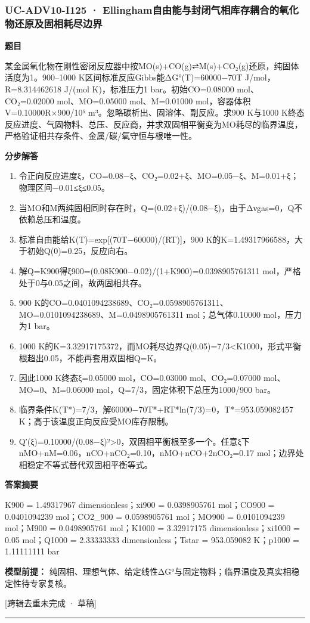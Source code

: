 \documentclass[UTF8,11pt,a4paper]{ctexart}
\begin{document}
\subsubsection*{UC-ADV10-I125 · Ellingham自由能与封闭气相库存耦合的氧化物还原及固相耗尽边界}
\noindent\textbf{题目}\par
某金属氧化物在刚性密闭反应器中按MO(s)+CO(g)⇌M(s)+CO₂(g)还原，纯固体活度为1。900–1000 K区间标准反应Gibbs能ΔG°(T)=60000−70T J/mol，R=8.314462618 J/(mol K)，标准压力1 bar。初始CO=0.08000 mol、CO₂=0.02000 mol、MO=0.05000 mol、M=0.01000 mol，容器体积V=0.10000R×900/10⁵ m³。忽略碳析出、固溶体、副反应。求900 K与1000 K终态反应进度、气固物料、总压、反应商，并求双固相平衡变为MO耗尽的临界温度，严格验证相共存条件、金属/碳/氧守恒与根唯一性。\par
\medskip\noindent\textbf{分步解答}
\begin{enumerate}
\item 令正向反应进度ξ，CO=0.08−ξ、CO₂=0.02+ξ、MO=0.05−ξ、M=0.01+ξ；物理区间−0.01≤ξ≤0.05。
\item 当MO和M两纯固相同时存在时，Q=(0.02+ξ)/(0.08−ξ)，由于Δνgas=0，Q不依赖总压和温度。
\item 标准自由能给K(T)=exp[(70T−60000)/(RT)]，900 K的K=1.49317966588，大于初始Q(0)=0.25，反应向右。
\item 解Q=K900得ξ900=(0.08K900−0.02)/(1+K900)=0.0398905761311 mol，严格处于0与0.05之间，故两固相共存。
\item 900 K的CO=0.0401094238689、CO₂=0.0598905761311、MO=0.0101094238689、M=0.0498905761311 mol；总气体0.10000 mol，压力为1 bar。
\item 1000 K的K=3.32917175372，而MO耗尽边界Q(0.05)=7/3<K1000，形式平衡根超出0.05，不能再套用双固相Q=K。
\item 因此1000 K终态ξ=0.05000 mol，CO=0.03000 mol、CO₂=0.07000 mol、MO=0、M=0.06000 mol，Q=7/3，固定体积下总压为1000/900 bar。
\item 临界条件K(T*)=7/3，解60000−70T*+RT*ln(7/3)=0，T*=953.059082457 K；高于该温度正向反应受MO库存限制。
\item Q′(ξ)=0.10000/(0.08−ξ)²>0，双固相平衡根至多一个。任意ξ下nMO+nM=0.06，nCO+nCO₂=0.10，nMO+nCO+2nCO₂=0.17 mol；边界处相稳定不等式替代双固相平衡等式。
\end{enumerate}
\noindent\textbf{答案摘要}\par
K900 = 1.49317967 dimensionless；xi900 = 0.0398905761 mol；CO900 = 0.0401094239 mol；CO2\_900 = 0.0598905761 mol；MO900 = 0.0101094239 mol；M900 = 0.0498905761 mol；K1000 = 3.32917175 dimensionless；xi1000 = 0.05 mol；Q1000 = 2.33333333 dimensionless；Tstar = 953.059082 K；p1000 = 1.11111111 bar\par
\noindent\textbf{模型前提：}
纯固相、理想气体、给定线性ΔG°与固定物料；临界温度及真实相稳定性待专家复核。\par
\noindent\textcolor{red!65!black}{[跨辑去重未完成 · 草稿]} \par
\medskip\hrule\medskip
\end{document}
